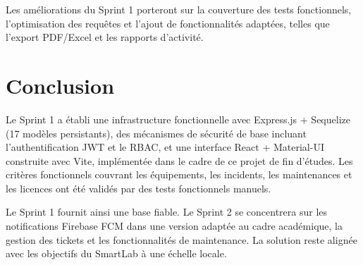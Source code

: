 Les améliorations du Sprint 1 porteront sur la couverture des tests fonctionnels, l’optimisation des requêtes et l’ajout de fonctionnalités adaptées, telles que l’export PDF/Excel et les rapports d’activité.
\section*{Conclusion}
\label{sec:conclusion_sprint1}

Le Sprint 1 a établi une infrastructure fonctionnelle avec Express.js\cite{expressjs2024} + Sequelize\cite{sequelize2024} (17 modèles persistants), des mécanismes de sécurité de base incluant l’authentification JWT et le RBAC, et une interface React\cite{react2024} + Material-UI\cite{materialui2024} construite avec Vite\cite{vite2024}, implémentée dans le cadre de ce projet de fin d’études. Les critères fonctionnels couvrant les équipements, les incidents, les maintenances et les licences ont été validés par des tests fonctionnels manuels.

Le Sprint 1 fournit ainsi une base fiable. Le Sprint 2 se concentrera sur les notifications Firebase FCM dans une version adaptée au cadre académique, la gestion des tickets et les fonctionnalités de maintenance. La solution reste alignée avec les objectifs du SmartLab à une échelle locale.



